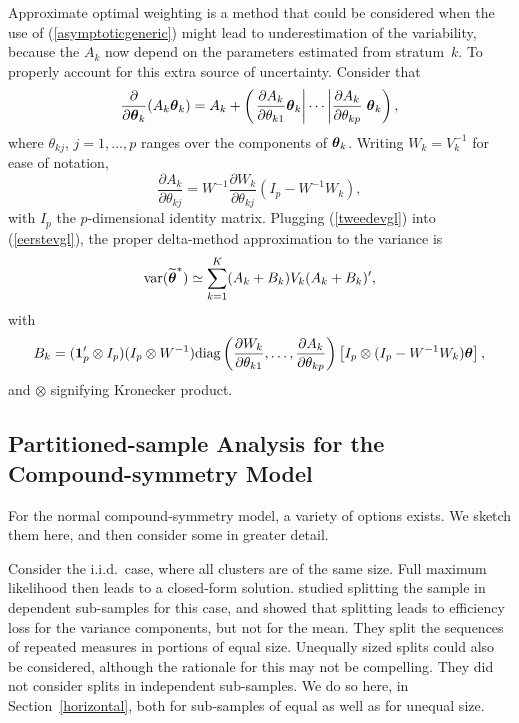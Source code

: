 \documentclass[11pt,a5paper,twoside]{book}
\newcommand{\bftheta}{\mbox{\boldmath $\theta$}}
\begin{document}
Approximate optimal weighting is a method that could be considered when
the use of  (\ref{asymptoticgeneric}) might lead to underestimation of the 
variability, because the $A_k$ now depend on the parameters 
estimated from stratum~$k$. To properly account for this 
extra source of uncertainty. Consider that
\begin{equation}
\label{eerstevgl}
\frac{\partial}{\partial\bftheta_k}(A_k\bftheta_k)=A_k+
\left(
\left.
\frac{\partial A_k}{\partial\theta_{k1}}\bftheta_k\right|
\cdots
\left|
\frac{\partial A_k}{\partial\theta_{kp}}
\right.\bftheta_k
\right),
\end{equation}
where $\theta_{kj}$, $j=1,\dots,p$ ranges over the components of 
$\bftheta_k$.  Writing $W_k=V_k^{-1}$ for ease of notation,
\begin{equation}
\frac{\partial A_k}{\partial\theta_{kj}}=W^{-1}\frac{\partial W_k}{\partial\theta_{kj}}(I_p-W^{-1}W_k),
\label{tweedevgl}
\end{equation}
with $I_p$ the $p$-dimensional identity matrix. Plugging (\ref{tweedevgl}) 
into (\ref{eerstevgl}), the proper delta-method approximation to the 
variance is
\begin{equation}
\label{asymptoticgenerictwee}
\mbox{var}(\widetilde{\bftheta}^*)\simeq
\sum_{k=1}^K(A_k+B_k)V_k(A_k+B_k)',
\end{equation}
with
$$
B_k=(\mbox{\bfseries 1}_p'\otimes I_p)(I_p\otimes W^{-1})\mbox{diag}\left(
\frac{\partial W_k}{\partial\theta_{k1}},\dots,
\frac{\partial A_k}{\partial\theta_{kp}}
\right)
\left[I_p\otimes(I_p-W^{-1}W_k)\bftheta\right],
$$
and $\otimes$ signifying Kronecker product.



\subsection{Partitioned-sample Analysis for the Compound-symmetry Model}
\label{psa7}

For the normal compound-symmetry model,
a variety of options exists. We  sketch them here, and then 
consider some in greater detail.

Consider the i.i.d.\ case, where all clusters are of the same size. 
Full maximum likelihood then leads to a closed-form solution. \cite{Iddi2011} 
studied splitting the sample in dependent sub-samples for this case, and 
showed that splitting leads to efficiency loss for the variance 
components, but not for the mean. They split the sequences of repeated 
measures in portions of equal size. Unequally sized splits 
could also be considered, although the rationale for this may not be 
compelling. They did not consider splits in independent sub-samples. 
We do so here, in Section~\ref{horizontal},
both for sub-samples 
of equal as well as for unequal size.
\end{document}

